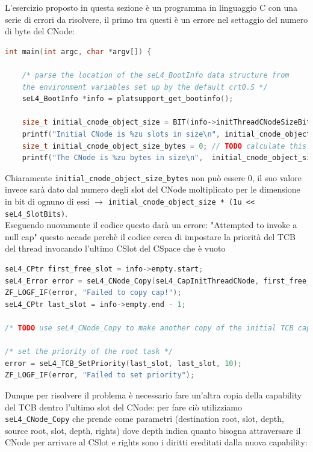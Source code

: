 L'esercizio proposto in questa sezione è un programma in linguaggio C con una serie di errori da risolvere, il primo tra questi è un errore nel settaggio del numero di byte del CNode:
\begin{lstlisting}[language=C++]
int main(int argc, char *argv[]) {

    /* parse the location of the seL4_BootInfo data structure from
    the environment variables set up by the default crt0.S */
    seL4_BootInfo *info = platsupport_get_bootinfo();

    size_t initial_cnode_object_size = BIT(info->initThreadCNodeSizeBits);
    printf("Initial CNode is %zu slots in size\n", initial_cnode_object_size);
    size_t initial_cnode_object_size_bytes = 0; // TODO calculate this.
    printf("The CNode is %zu bytes in size\n", 	initial_cnode_object_size_bytes);
\end{lstlisting}
Chiaramente \texttt{initial\_cnode\_object\_size\_bytes} non può essere 0, il suo valore invece sarà dato dal numero degli slot del CNode moltiplicato per le dimensione in bit di ognuno di essi $\rightarrow$ \texttt{initial\_cnode\_object\_size * (1u << seL4\_SlotBits)}.\\
Eseguendo nuovamente il codice questo darà un errore: "Attempted to invoke a null cap" questo accade perchè il codice cerca di impostare la priorità del TCB del thread invocando l'ultimo CSlot del CSpace che è vuoto
\begin{lstlisting}[language=C++]
seL4_CPtr first_free_slot = info->empty.start;
seL4_Error error = seL4_CNode_Copy(seL4_CapInitThreadCNode, first_free_slot, seL4_WordBits, seL4_CapInitThreadCNode, seL4_CapInitThreadTCB, seL4_WordBits, seL4_AllRights);
ZF_LOGF_IF(error, "Failed to copy cap!");
seL4_CPtr last_slot = info->empty.end - 1;
    
/* TODO use seL4_CNode_Copy to make another copy of the initial TCB capability to the last slot in the CSpace */

/* set the priority of the root task */
error = seL4_TCB_SetPriority(last_slot, last_slot, 10);
ZF_LOGF_IF(error, "Failed to set priority");
\end{lstlisting}
Dunque per risolvere il problema è necessario fare un'altra copia della capability del TCB dentro l'ultimo slot del CNode: per fare ciò utilizziamo \texttt{seL4\_CNode\_Copy} che prende come parametri (destination root, slot, depth, source root, slot, depth, rights) dove depth indica quanto bisogna attraversare il CNode per arrivare al CSlot e rights sono i diritti ereditati dalla nuova capability:\\
